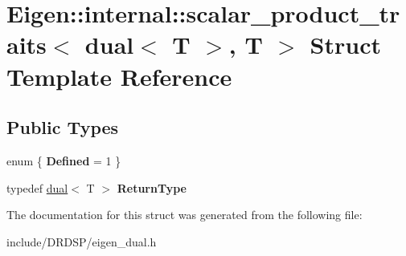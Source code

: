 \hypertarget{struct_eigen_1_1internal_1_1scalar__product__traits_3_01dual_3_01_t_01_4_00_01_t_01_4}{\section{Eigen\-:\-:internal\-:\-:scalar\-\_\-product\-\_\-traits$<$ dual$<$ T $>$, T $>$ Struct Template Reference}
\label{struct_eigen_1_1internal_1_1scalar__product__traits_3_01dual_3_01_t_01_4_00_01_t_01_4}
}
\subsection*{Public Types}
\begin{DoxyCompactItemize}
\item 
enum \{ {\bfseries Defined} = 1
 \}
\item 
\hypertarget{struct_eigen_1_1internal_1_1scalar__product__traits_3_01dual_3_01_t_01_4_00_01_t_01_4_a0a57bae15d94b88ccb84644c4a52fcdf}{typedef \hyperlink{struct_d_r_d_s_p_1_1dual}{dual}$<$ T $>$ {\bfseries Return\-Type}}\label{struct_eigen_1_1internal_1_1scalar__product__traits_3_01dual_3_01_t_01_4_00_01_t_01_4_a0a57bae15d94b88ccb84644c4a52fcdf}

\end{DoxyCompactItemize}


The documentation for this struct was generated from the following file\-:\begin{DoxyCompactItemize}
\item 
include/\-D\-R\-D\-S\-P/eigen\-\_\-dual.\-h\end{DoxyCompactItemize}
